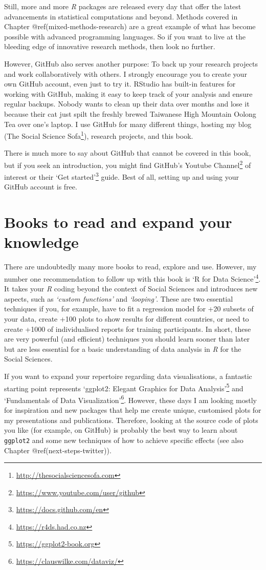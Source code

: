 \documentclass[
  letterpaper,
]{krantz}
\renewcommand{\href}[2]{#2\footnote{\url{#1}}}
\begin{document}
Still, more and more \emph{R} packages are released every day that offer
the latest advancements in statistical computations and beyond. Methods
covered in Chapter @ref(mixed-methods-research) are a great example of
what has become possible with advanced programming languages. So if you
want to live at the bleeding edge of innovative research methods, then
look no further.

However, GitHub also serves another purpose: To back up your research
projects and work collaboratively with others. I strongly encourage you
to create your own GitHub account, even just to try it. RStudio has
built-in features for working with GitHub, making it easy to keep track
of your analysis and ensure regular backups. Nobody wants to clean up
their data over months and lose it because their cat just spilt the
freshly brewed Taiwanese High Mountain Oolong Tea over one's laptop. I
use GitHub for many different things, hosting my blog
(\href{http://thesocialsciencesofa.com}{The Social Science Sofa}),
research projects, and this book.

There is much more to say about GitHub that cannot be covered in this
book, but if you seek an introduction, you might find
\href{https://www.youtube.com/user/github}{GitHub's Youtube Channel} of
interest or their \href{https://docs.github.com/en}{`Get started'}
guide. Best of all, setting up and using your GitHub account is free.

\section{Books to read and expand your
knowledge}\label{next-steps-books}

There are undoubtedly many more books to read, explore and use. However,
my number one recommendation to follow up with this book is
\href{https://r4ds.had.co.nz}{`R for Data Science'}. It takes your
\emph{R} coding beyond the context of Social Sciences and introduces new
aspects, such as \emph{`custom functions'} and \emph{`looping'}. These
are two essential techniques if you, for example, have to fit a
regression model for +20 subsets of your data, create +100 plots to show
results for different countries, or need to create +1000 of
individualised reports for training participants. In short, these are
very powerful (and efficient) techniques you should learn sooner than
later but are less essential for a basic understanding of data analysis
in \emph{R} for the Social Sciences.

If you want to expand your repertoire regarding data visualisations, a
fantastic starting point represents
\href{https://ggplot2-book.org}{`ggplot2: Elegant Graphics for Data
Analysis'} and \href{https://clauswilke.com/dataviz/}{`Fundamentals of
Data Visualization'}. However, these days I am looking mostly for
inspiration and new packages that help me create unique, customised
plots for my presentations and publications. Therefore, looking at the
source code of plots you like (for example, on GitHub) is probably the
best way to learn about \texttt{ggplot2} and some new techniques of how
to achieve specific effects (see also Chapter @ref(next-steps-twitter)).
\end{document}

